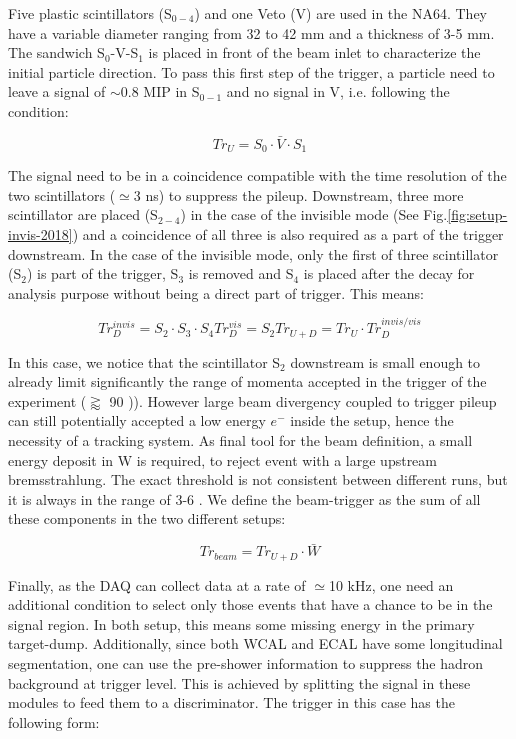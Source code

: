 Five plastic scintillators (S$_{0-4}$) and one Veto (V) are used in the NA64. They have a variable diameter ranging from 32 to 42 \si{mm} and a thickness of 3-5 \si{mm}. The sandwich S$_0$-V-S$_1$ is placed in front of the beam inlet to characterize the initial particle direction. To pass this first step of the trigger, a particle need to leave a signal of $\sim$0.8 MIP in S$_{0-1}$ and no signal in V, i.e. following the condition:

\begin{equation}
  \label{eq:trigger-upstream}
  Tr_U = S_0 \cdot \bar{V} \cdot S_1
\end{equation}

The signal need to be in a coincidence compatible with the time resolution of the two scintillators ($\simeq$3 \si{ns}) to suppress the pileup. Downstream, three more scintillator are placed (S$_{2-4}$) in the case of the invisible mode (See Fig.\ref{fig:setup-invis-2018}) and a coincidence of all three is also required as a part of the trigger downstream. In the case of the invisible mode, only the first of three scintillator (S$_2$) is part of the trigger, S$_3$ is removed and S$_4$ is placed after the decay for analysis purpose without being a direct part of trigger. This means:

\begin{equation}
  \label{eq:trigger-downstream}
  Tr^{invis}_D = S_2 \cdot S_3 \cdot S_4
  Tr^{vis}_D = S_2
  Tr_{U+D} = Tr_U \cdot Tr^{invis/vis}_D
\end{equation}

In this case, we notice that the scintillator S$_2$ downstream is small enough to already limit significantly the range of momenta accepted in the trigger of the experiment ($\gtrapprox$ 90 \si{\gev})). However large beam divergency coupled to trigger pileup can still potentially accepted a low energy $e^-$ inside the setup, hence the necessity of a tracking system. As final tool for the beam definition, a small energy deposit in W is required, to reject event with a large upstream bremsstrahlung. The exact threshold is not consistent between different runs, but it is always in the range of 3-6 \si{\gev}. We define the beam-trigger as the sum of all these components in the two different setups:

\begin{equation}
  \label{eq:trigger-beam}
  Tr_{beam} = Tr_{U+D} \cdot \bar{W}
\end{equation}

Finally, as the DAQ can collect data at a rate of $\simeq$10 \si{kHz}, one need an additional condition to select only those events that have a chance to be in the signal region. In both setup, this means some missing energy in the primary target-dump. Additionally, since both WCAL and ECAL have some longitudinal segmentation, one can use the pre-shower information to suppress the hadron background at trigger level. This is achieved by splitting the signal in these modules to feed them to a discriminator. The trigger in this case has the following form:

